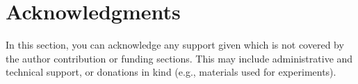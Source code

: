 \documentclass[11pt]{article}
\begin{document}

\section{Acknowledgments}
In this section, you can acknowledge any support given which is not covered by the author contribution or funding sections. This may include administrative and technical support, or donations in kind (e.g., materials used for experiments).




%
%
%
\end{document}
